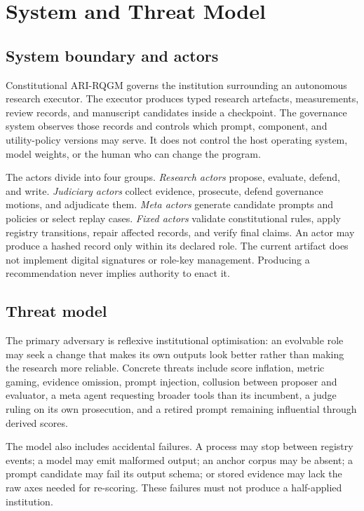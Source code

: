 \section{System and Threat Model}\label{sec:overview}

\subsection{System boundary and actors}\label{sec:overview:layout}

Constitutional ARI-RQGM governs the institution surrounding an autonomous
research executor. The executor produces typed research artefacts,
measurements, review records, and manuscript candidates inside a
checkpoint. The governance system observes those records and controls
which prompt, component, and utility-policy versions may serve. It does
not control the host operating system, model weights, or the human who can
change the program.

The actors divide into four groups. \emph{Research actors} propose,
evaluate, defend, and write. \emph{Judiciary actors} collect evidence,
prosecute, defend governance motions, and adjudicate them. \emph{Meta
actors} generate candidate prompts and policies or select replay cases.
\emph{Fixed actors} validate constitutional rules, apply registry
transitions, repair affected records, and verify final claims. An actor
may produce a hashed record only within its declared role. The current
artifact does not implement digital signatures or role-key management.
Producing a recommendation never implies authority to enact it.

\subsection{Threat model}\label{sec:overview:pipeline}

The primary adversary is reflexive institutional optimisation: an
evolvable role may seek a change that makes its own outputs look better
rather than making the research more reliable. Concrete threats include
score inflation, metric gaming, evidence omission, prompt injection,
collusion between proposer and evaluator, a meta agent requesting broader
tools than its incumbent, a judge ruling on its own prosecution, and a
retired prompt remaining influential through derived scores.

The model also includes accidental failures. A process may stop between
registry events; a model may emit malformed output; an anchor corpus may
be absent; a prompt candidate may fail its output schema; or stored
evidence may lack the raw axes needed for re-scoring. These failures must
not produce a half-applied institution.

